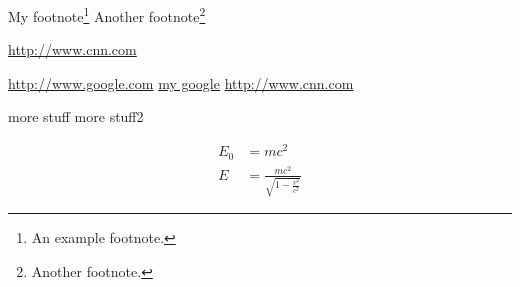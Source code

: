 \documentclass[10pt,a4paper]{article}
\begin{document}
  \begin{flushleft}
  My footnote\footnote{An example footnote.}
  Another footnote\footnote{Another footnote.}

  \hyperref[cnn]{http://www.cnn.com}

  \url{http://www.google.com}
  \href{http://www.google.com}{my google}
  \href{http://www.cnn.com}{http://www.cnn.com}

  \end{flushleft}
  more stuff
  more stuff2

  \begin{align}
    E_0 &= mc^2                              \\
    E &= \frac{mc^2}{\sqrt{1-\frac{v^2}{c^2}}}
  \end{align}
\end{document}
